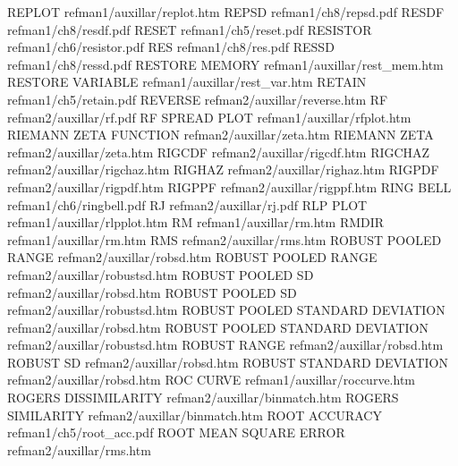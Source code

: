 REPLOT                                  refman1/auxillar/replot.htm
REPSD                                   refman1/ch8/repsd.pdf
RESDF                                   refman1/ch8/resdf.pdf
RESET                                   refman1/ch5/reset.pdf
RESISTOR                                refman1/ch6/resistor.pdf
RES                                     refman1/ch8/res.pdf
RESSD                                   refman1/ch8/ressd.pdf
RESTORE MEMORY                          refman1/auxillar/rest_mem.htm
RESTORE VARIABLE                        refman1/auxillar/rest_var.htm
RETAIN                                  refman1/ch5/retain.pdf
REVERSE                                 refman2/auxillar/reverse.htm
RF                                      refman2/auxillar/rf.pdf
RF SPREAD PLOT                          refman1/auxillar/rfplot.htm
RIEMANN ZETA FUNCTION                   refman2/auxillar/zeta.htm
RIEMANN ZETA                            refman2/auxillar/zeta.htm
RIGCDF                                  refman2/auxillar/rigcdf.htm
RIGCHAZ                                 refman2/auxillar/rigchaz.htm
RIGHAZ                                  refman2/auxillar/righaz.htm
RIGPDF                                  refman2/auxillar/rigpdf.htm
RIGPPF                                  refman2/auxillar/rigppf.htm
RING BELL                               refman1/ch6/ringbell.pdf
RJ                                      refman2/auxillar/rj.pdf
RLP PLOT                                refman1/auxillar/rlpplot.htm
RM                                      refman1/auxillar/rm.htm
RMDIR                                   refman1/auxillar/rm.htm
RMS                                     refman2/auxillar/rms.htm
ROBUST POOLED RANGE                     refman2/auxillar/robsd.htm
ROBUST POOLED RANGE                     refman2/auxillar/robustsd.htm
ROBUST POOLED SD                        refman2/auxillar/robsd.htm
ROBUST POOLED SD                        refman2/auxillar/robustsd.htm
ROBUST POOLED STANDARD DEVIATION        refman2/auxillar/robsd.htm
ROBUST POOLED STANDARD DEVIATION        refman2/auxillar/robustsd.htm
ROBUST RANGE                            refman2/auxillar/robsd.htm
ROBUST SD                               refman2/auxillar/robsd.htm
ROBUST STANDARD DEVIATION               refman2/auxillar/robsd.htm
ROC CURVE                               refman1/auxillar/roccurve.htm
ROGERS DISSIMILARITY                    refman2/auxillar/binmatch.htm
ROGERS SIMILARITY                       refman2/auxillar/binmatch.htm
ROOT ACCURACY                           refman1/ch5/root_acc.pdf
ROOT MEAN SQUARE ERROR                  refman2/auxillar/rms.htm
